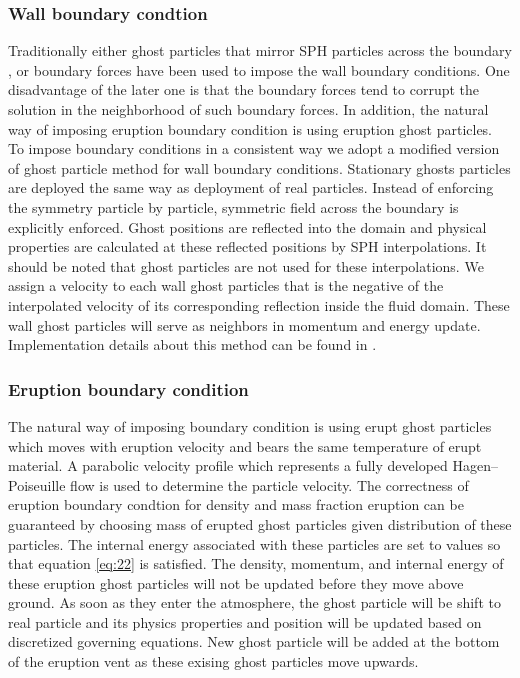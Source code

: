 \documentclass[10pt,a4paper]{article}
\begin{document}
\subsubsection{Wall boundary condtion}
Traditionally either ghost particles that mirror SPH particles across the boundary \cite{ferrari2009new}, or boundary forces \citep{monaghan2009sph} have been used to impose the wall boundary conditions. One disadvantage of the later one is that the boundary forces tend to corrupt the solution in the neighborhood of such boundary forces. In addition, the natural way of imposing eruption boundary condition is using eruption ghost particles. To impose boundary conditions in a consistent way we adopt a modified version of ghost particle method \cite{kumar2013parallel} for wall boundary conditions. Stationary ghosts particles are deployed the same way as deployment of real particles. Instead of enforcing the symmetry particle by particle, symmetric field across the boundary is explicitly enforced. Ghost positions are reflected into the domain and physical properties are calculated at these reflected positions by SPH interpolations. It should be noted that ghost particles are not used for these interpolations. We assign a velocity to each wall ghost particles that is the negative of the interpolated velocity of its corresponding reflection inside the fluid domain. These wall ghost particles will serve as neighbors in momentum and energy update. Implementation details about this method can be found in \cite{kumar2013parallel}.
\subsubsection{Eruption boundary condition}
The natural way of imposing boundary condition is using erupt ghost particles which moves with eruption velocity and bears the same temperature of erupt material. A parabolic velocity profile which represents a fully developed Hagen–Poiseuille flow is used to determine the particle velocity. The correctness of eruption boundary condtion for density and mass fraction eruption can be guaranteed by choosing mass of erupted ghost particles given distribution of these particles. The internal energy associated with these particles are set to values so that equation \ref{eq:22} is satisfied. The density, momentum, and internal energy of these eruption ghost particles will not be updated before they move above ground. As soon as they enter the atmosphere, the ghost particle will be shift to real particle and its physics properties and position will be updated based on discretized governing equations. New ghost particle will be added at the bottom of the eruption vent as these exising ghost particles move upwards.\\
\end{document}

